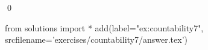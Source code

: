 
\begin{ex} 
  \label{ex:countability7}
  
  \qed
\end{ex} 
\begin{python0}
from solutions import *
add(label="ex:countability7",
    srcfilename='exercises/countability7/answer.tex') 
\end{python0}
